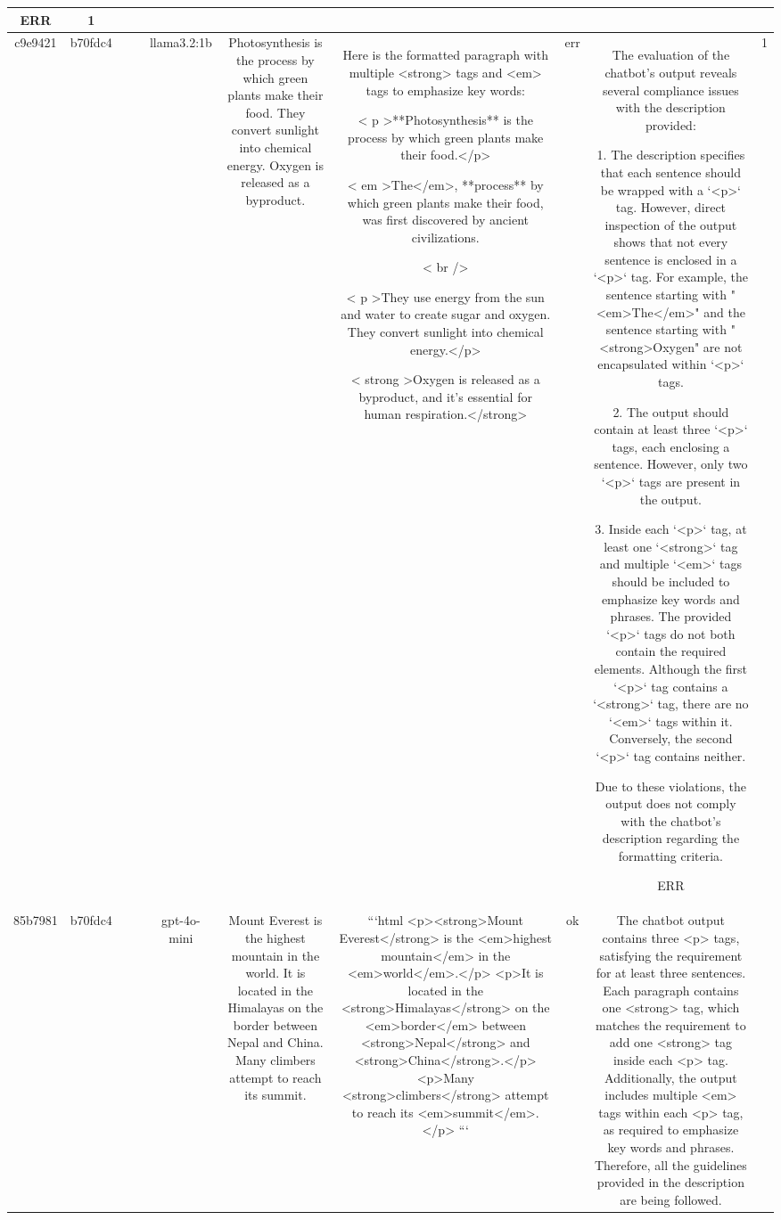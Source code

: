 \begin{table}[h!]
\begin{tabular}{|c|c|c|c|c|c|c|c|c|c|}
ERR & 1\\
\hline
c9e9421 & b70fdc4 &  &  & llama3.2:1b & Photosynthesis is the process by which green plants make their food. They convert sunlight into chemical energy. Oxygen is released as a byproduct. & Here is the formatted paragraph with multiple <strong> tags and <em> tags to emphasize key words:

< p >**Photosynthesis** is the process by which green plants make their food.</p>

< em >The</em>, **process** by which green plants make their food, was first discovered by ancient civilizations.

< br />

< p >They use energy from the sun and water to create sugar and oxygen. They convert sunlight into chemical energy.</p>

< strong >Oxygen is released as a byproduct, and it's essential for human respiration.</strong> & err & The evaluation of the chatbot's output reveals several compliance issues with the description provided:

1. The description specifies that each sentence should be wrapped with a `<p>` tag. However, direct inspection of the output shows that not every sentence is enclosed in a `<p>` tag. For example, the sentence starting with "<em>The</em>" and the sentence starting with "<strong>Oxygen" are not encapsulated within `<p>` tags.

2. The output should contain at least three `<p>` tags, each enclosing a sentence. However, only two `<p>` tags are present in the output.

3. Inside each `<p>` tag, at least one `<strong>` tag and multiple `<em>` tags should be included to emphasize key words and phrases. The provided `<p>` tags do not both contain the required elements. Although the first `<p>` tag contains a `<strong>` tag, there are no `<em>` tags within it. Conversely, the second `<p>` tag contains neither.

Due to these violations, the output does not comply with the chatbot's description regarding the formatting criteria.

ERR & 1\\
\hline
85b7981 & b70fdc4 &  &  & gpt-4o-mini & Mount Everest is the highest mountain in the world. It is located in the Himalayas on the border between Nepal and China. Many climbers attempt to reach its summit. & ```html
<p><strong>Mount Everest</strong> is the <em>highest mountain</em> in the <em>world</em>.</p>
<p>It is located in the <strong>Himalayas</strong> on the <em>border</em> between <strong>Nepal</strong> and <strong>China</strong>.</p>
<p>Many <strong>climbers</strong> attempt to reach its <em>summit</em>.</p>
``` & ok & The chatbot output contains three <p> tags, satisfying the requirement for at least three sentences. Each paragraph contains one <strong> tag, which matches the requirement to add one <strong> tag inside each <p> tag. Additionally, the output includes multiple <em> tags within each <p> tag, as required to emphasize key words and phrases. Therefore, all the guidelines provided in the description are being followed.


\end{tabular}
\end{table}
